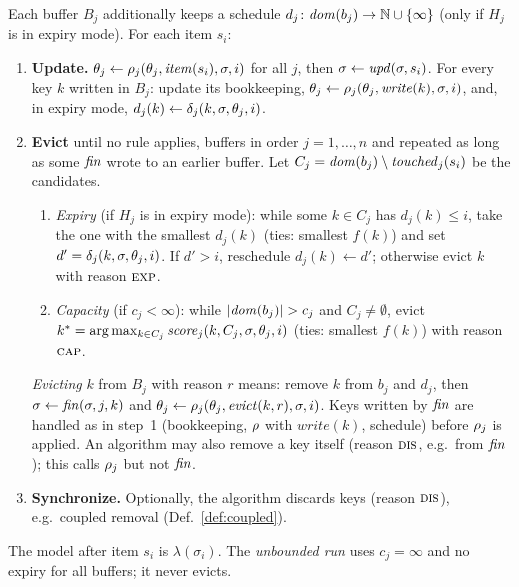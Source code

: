 \begin{definition}[Run]\label{def:run}
Each buffer $B_j$ additionally keeps a schedule
$d_j \colon \mathit{dom}(b_j) \to \mathbb{N} \cup \{\infty\}$ (only if $H_j$ is in
expiry mode). For each item $s_i$:
\begin{enumerate}
  \item \textbf{Update.} $\theta_j \leftarrow \rho_j(\theta_j, \mathit{item}(s_i), \sigma, i)$
        for all $j$, then $\sigma \leftarrow \mathit{upd}(\sigma, s_i)$. For every key
        $k$ written in $B_j$: update its bookkeeping,
        $\theta_j \leftarrow \rho_j(\theta_j, \mathit{write}(k), \sigma, i)$,
        and, in expiry mode, $d_j(k) \leftarrow \delta_j(k, \sigma, \theta_j, i)$.
  \item \textbf{Evict} until no rule applies, buffers in order $j = 1, \dots, n$
        and repeated as long as some $\mathit{fin}$ wrote to an earlier buffer.
        Let $C_j = \mathit{dom}(b_j) \setminus \mathit{touched}_j(s_i)$ be the candidates.
        \begin{enumerate}
          \item \emph{Expiry} (if $H_j$ is in expiry mode): while some
                $k \in C_j$ has $d_j(k) \le i$, take the one with the smallest
                $d_j(k)$ (ties: smallest $f(k)$) and set
                $d' = \delta_j(k, \sigma, \theta_j, i)$.
                If $d' > i$, reschedule $d_j(k) \leftarrow d'$;
                otherwise evict $k$ with reason $\textsc{exp}$.
          \item \emph{Capacity} (if $c_j < \infty$): while
                $|\mathit{dom}(b_j)| > c_j$ and $C_j \neq \emptyset$, evict
                $k^* = \arg\max_{k \in C_j} \mathit{score}_j(k, C_j, \sigma, \theta_j, i)$
                (ties: smallest $f(k)$) with reason $\textsc{cap}$.
        \end{enumerate}
        \emph{Evicting} $k$ from $B_j$ with reason $r$ means: remove $k$ from
        $b_j$ and $d_j$, then
        $\sigma \leftarrow \mathit{fin}(\sigma, j, k)$ and
        $\theta_j \leftarrow \rho_j(\theta_j, \mathit{evict}(k, r), \sigma, i)$.
        Keys written by $\mathit{fin}$ are handled as in step~1 (bookkeeping, $\rho$
        with $\mathit{write}(k)$, schedule) before $\rho_j$ is applied.
        An algorithm may also remove a key itself (reason $\textsc{dis}$, e.g.\ from
        $\mathit{fin}$); this calls $\rho_j$ but not $\mathit{fin}$.
  \item \textbf{Synchronize.} Optionally, the algorithm discards keys (reason
        $\textsc{dis}$), e.g.\ coupled removal (Def.~\ref{def:coupled}).
\end{enumerate}
The model after item $s_i$ is $\lambda(\sigma_i)$. The \emph{unbounded run}
uses $c_j = \infty$ and no expiry for all buffers; it never evicts.
\end{definition}

